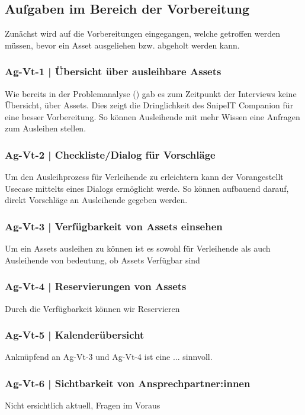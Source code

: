 
\subsection*{Aufgaben im Bereich der Vorbereitung}
Zunächst wird auf die Vorbereitungen eingegangen, welche getroffen werden müssen, bevor ein Asset
ausgeliehen bzw. abgeholt werden kann.
\subsubsection*{Ag-Vt-1 | Übersicht über ausleihbare Assets}
Wie bereits in der Problemanalyse () gab es zum Zeitpunkt der Interviews keine Übersicht, über
Assets. Dies zeigt die Dringlichkeit des SnipeIT Companion für eine besser Vorbereitung. So
können Ausleihende mit mehr Wissen eine Anfragen zum Ausleihen stellen. 
\subsubsection*{Ag-Vt-2 | Checkliste/Dialog für Vorschläge}
Um den Ausleihprozess für Verleihende zu erleichtern kann der Vorangestellt Usecase mittelts eines
Dialogs ermöglicht werde. So können aufbauend darauf, direkt Vorschläge an Ausleihende gegeben werden.
\subsubsection*{Ag-Vt-3 | Verfügbarkeit von Assets einsehen}
Um ein Assets ausleihen zu können ist es sowohl für Verleihende als auch Ausleihende von bedeutung, 
ob Assets Verfügbar sind
\subsubsection*{Ag-Vt-4 | Reservierungen von Assets}
Durch die Verfügbarkeit können wir Reservieren
\subsubsection*{Ag-Vt-5 | Kalenderübersicht}
Anknüpfend an Ag-Vt-3 und Ag-Vt-4 ist eine ... sinnvoll.
\subsubsection*{Ag-Vt-6 | Sichtbarkeit von Ansprechpartner:innen}
Nicht ersichtlich aktuell, Fragen im Voraus 


